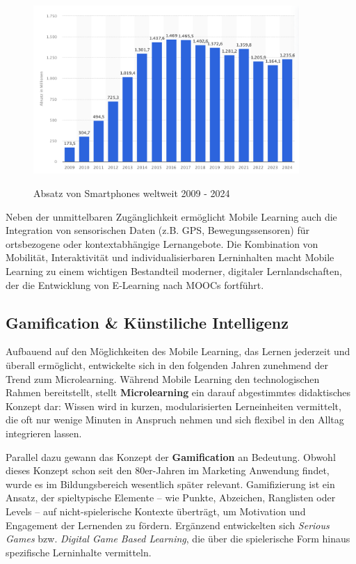 \begin{figure}[htbp]
    \centering
    \includegraphics[width=0.90\textwidth]{img/Absatz von Smartphones.png}
    \caption{Absatz von Smartphones weltweit 2009 - 2024}
	\cite{statista_absatz_2025}
    \label{fig:absatz_smartphones}
\end{figure}

Neben der unmittelbaren Zugänglichkeit ermöglicht Mobile Learning auch die Integration von sensorischen Daten (z.B. GPS, Bewegungssensoren) für ortsbezogene oder kontextabhängige Lernangebote. Die Kombination von Mobilität, Interaktivität und individualisierbaren Lerninhalten macht Mobile Learning zu einem wichtigen Bestandteil moderner, digitaler Lernlandschaften, der die Entwicklung von E‑Learning nach MOOCs fortführt.\parencite[S.~10]{sharples_theory_2010}

\subsection{Gamification \& Künstiliche Intelligenz}

Aufbauend auf den Möglichkeiten des Mobile Learning, das Lernen jederzeit und überall ermöglicht, entwickelte sich in den folgenden Jahren zunehmend der Trend zum Microlearning. Während Mobile Learning den technologischen Rahmen bereitstellt, stellt \textbf{Microlearning} ein darauf abgestimmtes didaktisches Konzept dar: Wissen wird in kurzen, modularisierten Lerneinheiten vermittelt, die oft nur wenige Minuten in Anspruch nehmen und sich flexibel in den Alltag integrieren lassen.\parencite[S.~18--20]{hug_outline_2007}\parencite[S.~5--8]{buchem_microlearning_2010} 

Parallel dazu gewann das Konzept der \textbf{Gamification} an Bedeutung. Obwohl dieses Konzept schon seit den 80er-Jahren im Marketing Anwendung findet, wurde es im Bildungsbereich wesentlich später relevant. Gamifizierung ist ein Ansatz, der spieltypische Elemente – wie Punkte, Abzeichen, Ranglisten oder Levels – auf nicht-spielerische Kontexte überträgt, um Motivation und Engagement der Lernenden zu fördern.\parencite[S.~452]{schlag_gamifizierung_2021} Ergänzend entwickelten sich \textit{Serious Games} bzw. \textit{Digital Game Based Learning}, die über die spielerische Form hinaus spezifische Lerninhalte vermitteln.\parencite[S.~14]{niegemann_kompendium_2008}

